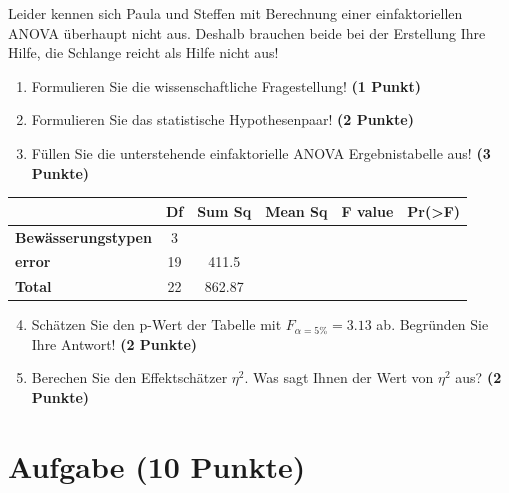 \documentclass[a4paper, 9pt]{scrartcl}\usepackage[]{graphicx}\usepackage[]{xcolor}
\begin{document}
\vspace{1ex}

Leider kennen sich Paula und Steffen mit Berechnung einer einfaktoriellen ANOVA überhaupt nicht aus. Deshalb brauchen beide bei der Erstellung Ihre Hilfe, die Schlange reicht als Hilfe nicht aus! 

\begin{enumerate}
  \item Formulieren Sie die wissenschaftliche Fragestellung! \textbf{(1 Punkt)}
  \item Formulieren Sie das statistische Hypothesenpaar! \textbf{(2 Punkte)}
\item Füllen Sie die unterstehende einfaktorielle ANOVA Ergebnistabelle aus! \textbf{(3 Punkte)}
\end{enumerate}

\vspace{1Ex}

\begin{center}
  \Large
  \begin{tabular}{lccccp{3cm}}
\toprule
     & \textbf{Df} & \textbf{Sum Sq} & \textbf{Mean Sq} & \textbf{F value} & \textbf{Pr(>F)} \strut\\
    \midrule
   \textbf{Bewässerungstypen}  & 3 &  &  &  &  \strut\\
   \textbf{error}  & 19 & 411.5 &  &  &  \strut\\
   \textbf{Total}  & 22 & 862.87 &  &  &  \strut\\
\bottomrule
  \end{tabular}
\end{center}

\vspace{1Ex}

\begin{enumerate}
  \setcounter{enumi}{3}
\item Schätzen Sie den p-Wert der Tabelle mit $F_{\alpha = 5\%} = 3.13$ ab. Begründen Sie Ihre Antwort! \textbf{(2 Punkte)}
\item Berechen Sie den Effektschätzer $\eta^2$. Was sagt Ihnen der Wert von $\eta^2$ aus? \textbf{(2 Punkte)}
\end{enumerate}



 
\clearpage

\section{Aufgabe \hfill (10 Punkte)}
\end{document}
